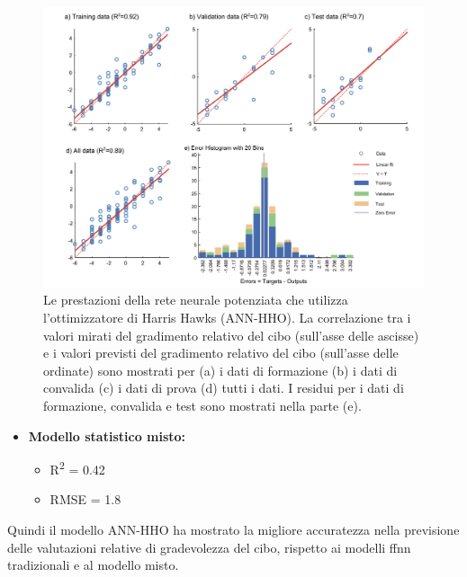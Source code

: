 \begin{figure}[H]
      \captionsetup{font=scriptsize}
      \centering
      \includegraphics[width=1\textwidth]{Chapters/Figures/ann-hho-result.png} 
      \caption{\small Le prestazioni della rete neurale potenziata che utilizza l'ottimizzatore di Harris Hawks (ANN-HHO). La correlazione tra i valori mirati del gradimento relativo del cibo (sull'asse delle ascisse) e i valori previsti del gradimento relativo del cibo (sull'asse delle ordinate) sono mostrati per (a) i dati di formazione (b) i dati di convalida (c) i dati di prova (d) tutti i dati. I residui per i dati di formazione, convalida e test sono mostrati nella parte (e). \cite{alamir2021enhanced}}
      \label{fig:ann-hho-abc}
\end{figure}

\newpage
\begin{itemize}
      \item \textbf{Modello statistico misto:}
            \begin{itemize}
                  \item R\textsuperscript{2} = 0.42
                  \item RMSE = 1.8
            \end{itemize}
\end{itemize}

Quindi il modello ANN-HHO ha mostrato la migliore accuratezza nella previsione delle valutazioni relative di gradevolezza del cibo, rispetto ai modelli \gls{ffnn} tradizionali e al modello misto.

